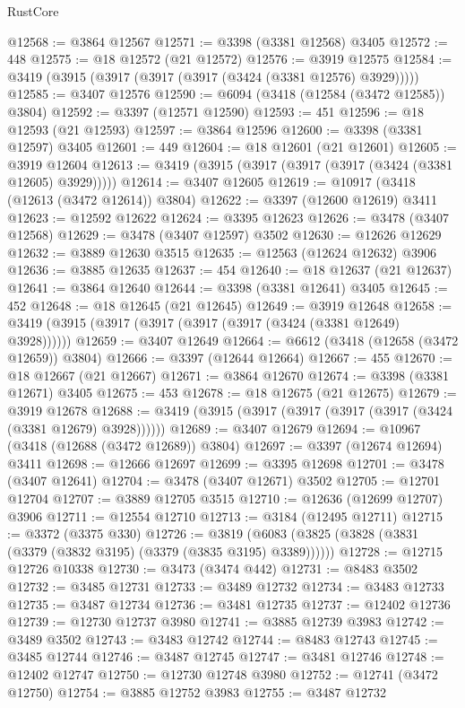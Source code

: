 \begin{lexlean}{RustCore}
\begin{coremodule}
@12568 := @3864 @12567
@12571 := @3398 (@3381 @12568) @3405
@12572 := 448
@12575 := @18 @12572 (@21 @12572)
@12576 := @3919 @12575
@12584 := @3419 (@3915 (@3917 (@3917 (@3917 (@3424 (@3381 @12576) @3929)))))
@12585 := @3407 @12576
@12590 := @6094 (@3418 (@12584 (@3472 @12585)) @3804)
@12592 := @3397 (@12571 @12590)
@12593 := 451
@12596 := @18 @12593 (@21 @12593)
@12597 := @3864 @12596
@12600 := @3398 (@3381 @12597) @3405
@12601 := 449
@12604 := @18 @12601 (@21 @12601)
@12605 := @3919 @12604
@12613 := @3419 (@3915 (@3917 (@3917 (@3917 (@3424 (@3381 @12605) @3929)))))
@12614 := @3407 @12605
@12619 := @10917 (@3418 (@12613 (@3472 @12614)) @3804)
@12622 := @3397 (@12600 @12619) @3411
@12623 := @12592 @12622
@12624 := @3395 @12623
@12626 := @3478 (@3407 @12568)
@12629 := @3478 (@3407 @12597) @3502
@12630 := @12626 @12629
@12632 := @3889 @12630 @3515
@12635 := @12563 (@12624 @12632) @3906
@12636 := @3885 @12635
@12637 := 454
@12640 := @18 @12637 (@21 @12637)
@12641 := @3864 @12640
@12644 := @3398 (@3381 @12641) @3405
@12645 := 452
@12648 := @18 @12645 (@21 @12645)
@12649 := @3919 @12648
@12658 := @3419 (@3915 (@3917 (@3917 (@3917 (@3917 (@3424 (@3381 @12649) @3928))))))
@12659 := @3407 @12649
@12664 := @6612 (@3418 (@12658 (@3472 @12659)) @3804)
@12666 := @3397 (@12644 @12664)
@12667 := 455
@12670 := @18 @12667 (@21 @12667)
@12671 := @3864 @12670
@12674 := @3398 (@3381 @12671) @3405
@12675 := 453
@12678 := @18 @12675 (@21 @12675)
@12679 := @3919 @12678
@12688 := @3419 (@3915 (@3917 (@3917 (@3917 (@3917 (@3424 (@3381 @12679) @3928))))))
@12689 := @3407 @12679
@12694 := @10967 (@3418 (@12688 (@3472 @12689)) @3804)
@12697 := @3397 (@12674 @12694) @3411
@12698 := @12666 @12697
@12699 := @3395 @12698
@12701 := @3478 (@3407 @12641)
@12704 := @3478 (@3407 @12671) @3502
@12705 := @12701 @12704
@12707 := @3889 @12705 @3515
@12710 := @12636 (@12699 @12707) @3906
@12711 := @12554 @12710
@12713 := @3184 (@12495 @12711)
@12715 := @3372 (@3375 @330)
@12726 := @3819 (@6083 (@3825 (@3828 (@3831 (@3379 (@3832 @3195) (@3379 (@3835 @3195) @3389))))))
@12728 := @12715 @12726 @10338
@12730 := @3473 (@3474 @442)
@12731 := @8483 @3502
@12732 := @3485 @12731
@12733 := @3489 @12732
@12734 := @3483 @12733
@12735 := @3487 @12734
@12736 := @3481 @12735
@12737 := @12402 @12736
@12739 := @12730 @12737 @3980
@12741 := @3885 @12739 @3983
@12742 := @3489 @3502
@12743 := @3483 @12742
@12744 := @8483 @12743
@12745 := @3485 @12744
@12746 := @3487 @12745
@12747 := @3481 @12746
@12748 := @12402 @12747
@12750 := @12730 @12748 @3980
@12752 := @12741 (@3472 @12750)
@12754 := @3885 @12752 @3983
@12755 := @3487 @12732

\end{coremodule}
\end{lexlean}
